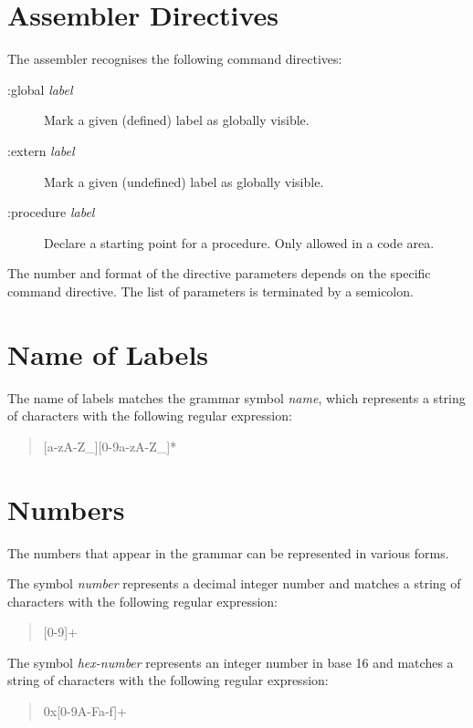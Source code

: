 \documentclass[twoside]{tce}
\begin{document}
\section{Assembler Directives}

\begin{grammar}

    \grlit{:}  

\end{grammar}

The assembler recognises the following command directives:
\begin{description}
\item[:global \emph{label}] %
  Mark a given (defined) label as globally visible.
\item[:extern \emph{label}] %
  Mark a given (undefined) label as globally visible.
\item[:procedure \emph{label}] %
  Declare a starting point for a procedure. Only allowed in a code area.
\end{description}

The number and format of the directive parameters depends on the specific
command directive. The list of parameters is terminated by a semicolon.

\section{Name of Labels}
\label{sec:names}

The name of labels matches the grammar symbol \emph{name}, which represents
a string of characters with the following regular expression:
\begin{quote}
  [a-zA-Z\_][0-9a-zA-Z\_]*
\end{quote}

\section{Numbers}
\label{sec:numbers}

The numbers that appear in the grammar can be represented in various forms.

The symbol \emph{number} represents a decimal integer number and matches a
string of characters with the following regular expression:
\begin{quote}
  [0-9]+
\end{quote}

The symbol \emph{hex-number} represents an integer number in base 16 and
matches a string of characters with the following regular expression:
\begin{quote}
  0x[0-9A-Fa-f]+
\end{quote}
\end{document}
